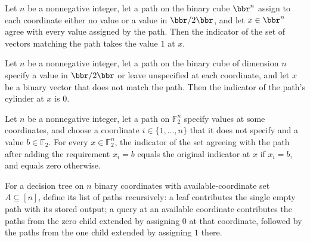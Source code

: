\begin{theorem}
\leanok
{}
Let $n$ be a nonnegative integer, let a path on the binary cube $\bbr^n$ assign to each
coordinate either no value or a value in $\bbr/2\bbr$, and let $x\in\bbr^n$ agree with
every value assigned by the path. Then the indicator of the set of vectors matching the
path takes the value $1$ at $x$.
\end{theorem}

\begin{theorem}
\leanok
{}
Let $n$ be a nonnegative integer, let a path on the binary cube of dimension $n$ specify
a value in $\bbr/2\bbr$ or leave unspecified at each coordinate, and let $x$ be a binary
vector that does not match the path. Then the indicator of the path's cylinder at $x$ is
$0$.
\end{theorem}

\begin{theorem}
\leanok
{}
Let $n$ be a nonnegative integer, let a path on $\mathbb{F}_2^n$ specify values at some
coordinates, and choose a coordinate $i\in\{1,\ldots,n\}$ that it does not specify and a
value $b\in\mathbb{F}_2$. For every $x\in\mathbb{F}_2^n$, the indicator of the set
agreeing with the path after adding the requirement $x_i=b$ equals the original
indicator at $x$ if $x_i=b$, and equals zero otherwise.
\end{theorem}

\begin{definition}
\leanok
{}
For a decision tree on $n$ binary coordinates with available-coordinate set
$A\subseteq[n]$, define its list of paths recursively: a leaf contributes the single
empty path with its stored output; a query at an available coordinate contributes the
paths from the zero child extended by assigning $0$ at that coordinate, followed by the
paths from the one child extended by assigning $1$ there.
\end{definition}

